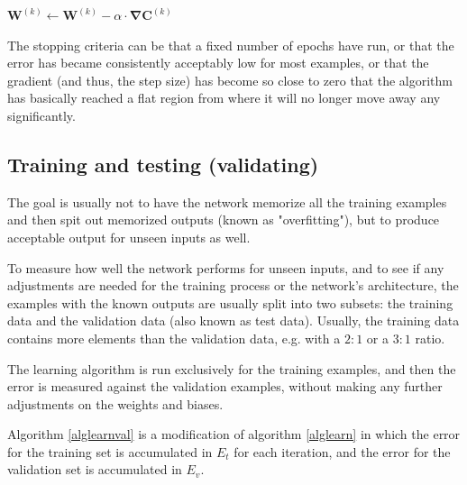 \documentclass[titlepage]{article}
\begin{document}
      \begin{algorithm}
        \caption{%
          Algorithm \ref{algadjustweights} with matrix-vector notation.
        } \label{algadjustweightsvec}
        \begin{algorithmic}
              \State $
                \mathbf{W}^{(k)} \gets
                  \mathbf{W}^{(k)} - \alpha \cdot \mathbf{\nabla C}^{(k)}
              $
            \EndFor
          \EndProcedure
        \end{algorithmic}
      \end{algorithm}

      The stopping criteria can be that a fixed number of epochs have run, or
      that the error has became consistently acceptably low for most examples,
      or that the gradient (and thus, the step size) has become so close to
      zero that the algorithm has basically reached a flat region from where it
      will no longer move away any significantly.

\newpage

    \subsection{Training and testing (validating)}

      The goal is usually not to have the network memorize all the training
      examples and then spit out memorized outputs (known as "overfitting"),
      but to produce acceptable output for unseen inputs as well.

      To measure how well the network performs for unseen inputs, and to see if
      any adjustments are needed for the training process or the network's
      architecture, the examples with the known outputs are usually split into
      two subsets: the training data and the validation data (also known as
      test data). Usually, the training data contains more elements than the
      validation data, e.g. with a $2:1$ or a $3:1$ ratio.

      The learning algorithm is run exclusively for the training examples, and
      then the error is measured against the validation examples, without
      making any further adjustments on the weights and biases.

      Algorithm \ref{alglearnval} is a modification of algorithm \ref{alglearn}
      in which the error for the training set is accumulated in $E_t$ for each
      iteration, and the error for the validation set is accumulated in $E_v$.
\end{document}
